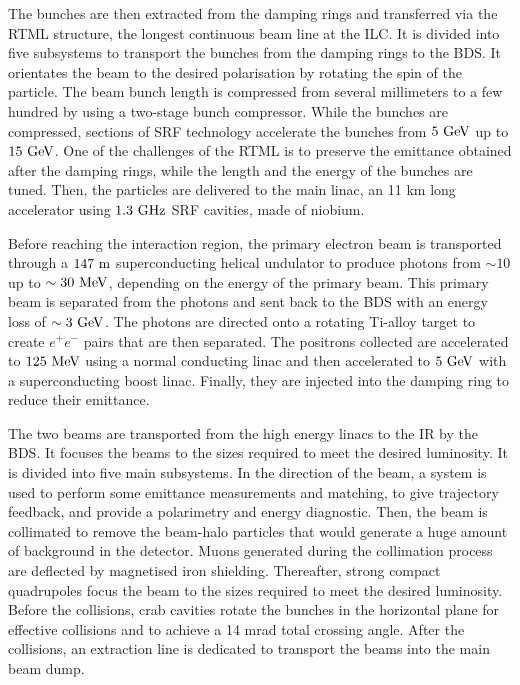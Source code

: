     The bunches are then extracted from the damping rings and transferred via the \gls{RTML} structure, the longest continuous beam line at the \gls{ILC}.
    It is divided into five subsystems to transport the bunches from the damping rings to the \gls{BDS}.
    It orientates the beam to the desired polarisation by rotating the spin of the particle.
    The beam bunch length is compressed  from several millimeters to a few hundred by using a two-stage bunch compressor.
    While the bunches are compressed, sections of \gls{SRF} technology accelerate the bunches from $5~\rm{GeV}$ up to $15~\rm{GeV}$.
    One of the challenges of the \gls{RTML} is to preserve the emittance obtained after the damping rings, while the length and the energy of the bunches are tuned.
    Then, the particles are delivered to the main linac, an 11 km long accelerator using $1.3~\rm{GHz}$ \gls{SRF} cavities, made of niobium.

    Before reaching the interaction region, the primary electron beam is transported through a $147~\rm{m}$ superconducting helical undulator to produce photons from $\sim 10$ up to $\sim 30~\rm{MeV}$, depending on the energy of the primary beam.
    This primary beam is separated from the photons and sent back to the \gls{BDS} with an energy loss of $\sim 3~\rm{GeV}$.
    The photons are directed onto a rotating Ti-alloy target to create $e^+e^-$ pairs that are then separated.
    The positrons collected are accelerated to $125~\rm{MeV}$ using a normal conducting linac and then accelerated to $5~\rm{GeV}$ with a superconducting boost linac.
    Finally, they are injected into the damping ring to reduce their emittance.

    The two beams are transported from the high energy linacs to the \gls{IR} by the \gls{BDS}.
    It focuses the beams to the sizes required to meet the desired luminosity.
    It is divided into five main subsystems. 
    In the direction of the beam, a system is used to perform some emittance measurements and matching, to give trajectory feedback, and provide a polarimetry and energy diagnostic. 
    Then, the beam is collimated to remove the beam-halo particles that would generate a huge amount of background in the detector.
    Muons generated during the collimation process are deflected by magnetised iron shielding.
    Thereafter, strong compact quadrupoles focus the beam to the sizes required to meet the desired luminosity. 
    Before the collisions, crab cavities rotate the bunches in the horizontal plane for effective collisions and to achieve a 14 mrad total crossing angle.
    After the collisions, an extraction line is dedicated to transport the beams into the main beam dump.

